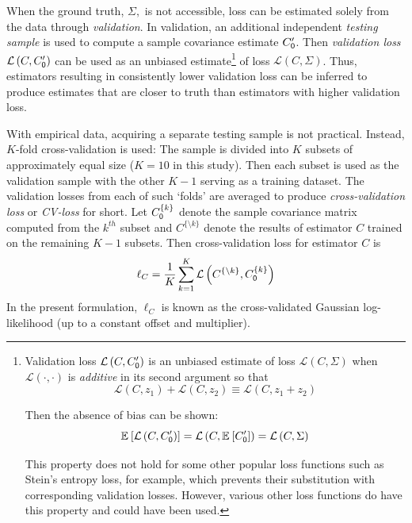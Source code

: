 \documentclass[10pt]{article}
\newcommand{\loss}[1]{\mathcal L\left(#1\right)}
\newcommand{\E}[2][]{\mathbb E_{#1}\left[ #2\right]}    %
\begin{document}
When the ground truth, $\Sigma,$ is not accessible, loss can be estimated solely from the data through \emph{validation}.  In validation, an additional independent \emph{testing sample} is used to compute a sample covariance estimate $C_{\sf 0}^\prime$.  Then \emph{validation loss} $\loss{C,C_{\sf 0}^\prime}$ can be used as an unbiased estimate\footnote
{
    Validation loss $\loss{C,C_{\sf 0}^\prime}$ is an unbiased estimate of loss $\loss{C,\Sigma}$ when $\loss{\cdot,\cdot}$ is \emph{additive} in its second argument so that 
 \begin{equation*}\label{eq:additivity}
 \loss{C,z_1} + \loss{C,z_2} \equiv \loss{C,z_1+z_2}
 \end{equation*}

Then the absence of bias can be shown:
\begin{equation*}
    \E{\loss{C,C_{\sf 0}^\prime}}=\loss{C,\E{C_{\sf 0}^\prime}}=\loss{C,\Sigma}
\end{equation*}

This property does not hold for some other popular loss functions such as Stein's entropy loss, for example, which prevents their substitution with corresponding validation losses. However, various other loss functions do have this property and could have been used.
} 
of loss $\loss{C,\Sigma}$.  Thus, estimators resulting in consistently lower validation loss can be inferred to produce estimates that are closer to truth than estimators with higher validation loss. 

With empirical data, acquiring a separate testing sample is not practical. Instead, $K$-fold cross-validation is used: The sample is divided into $K$ subsets of approximately equal size ($K=10$ in this study).  Then each subset is used as the validation sample with the other $K-1$ serving as a training dataset. The validation losses from each of such `folds' are averaged to produce \emph{cross-validation loss} or \emph{CV-loss} for short.  Let $C_{\sf 0}^{\{k\}}$ denote the sample covariance matrix computed from the $k^{th}$ subset and $C^{\{\setminus k\}}$ denote the results of estimator $C$ trained on the remaining $K-1$ subsets. Then cross-validation loss for estimator $C$ is
\begin{equation}\label{eq:cv-loss}
    \ell_C=\frac 1 K \sum\limits_{k=1}^K \loss{C^{\{\setminus k\}},C_{\sf 0}^{\{k\}}}
\end{equation}
In the present formulation, $\ell_C$ is known as the cross-validated Gaussian log-likelihood (up to a constant offset and multiplier).
\end{document}

